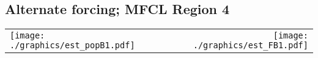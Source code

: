 \documentclass[letterpaper,KOMA,landscape,titlepage]{powersem}
\begin{document}
\begin{slide}\section{Alternate forcing; MFCL Region 4}
\label{fig:estr4}
\begin{center}
\begin{tabular}{lr}
\texttt{[image: ./graphics/est\_popB1.pdf]}&
\texttt{[image: ./graphics/est\_FB1.pdf]}\\
\end{tabular}
\end{center}
\end{slide}
\end{document}

